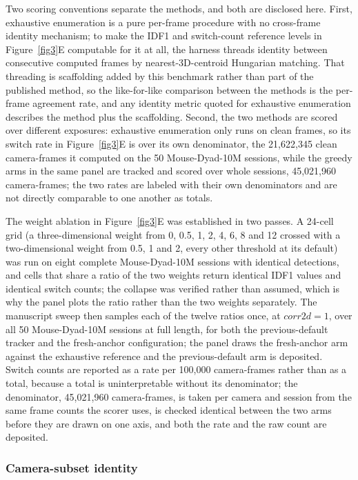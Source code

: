\documentclass[pdflatex, sn-nature]{sn-jnl}
\theoremstyle{thmstyleone}%
\theoremstyle{thmstyletwo}%
\theoremstyle{thmstylethree}%
\begin{document}
Two scoring conventions separate the methods, and both are disclosed here. First, exhaustive enumeration is a pure per-frame procedure with no cross-frame identity mechanism; to make the IDF1 and switch-count reference levels in Figure~\ref{fig3}E computable for it at all, the harness threads identity between consecutive computed frames by nearest-3D-centroid Hungarian matching. That threading is scaffolding added by this benchmark rather than part of the published method, so the like-for-like comparison between the methods is the per-frame agreement rate, and any identity metric quoted for exhaustive enumeration describes the method plus the scaffolding. Second, the two methods are scored over different exposures: exhaustive enumeration only runs on clean frames, so its switch rate in Figure~\ref{fig3}E is over its own denominator, the 21,622,345 clean camera-frames it computed on the 50 Mouse-Dyad-10M sessions, while the greedy arms in the same panel are tracked and scored over whole sessions, 45,021,960 camera-frames; the two rates are labeled with their own denominators and are not directly comparable to one another as totals.

The weight ablation in Figure~\ref{fig3}E was established in two passes. A 24-cell grid (a three-dimensional weight from 0, 0.5, 1, 2, 4, 6, 8 and 12 crossed with a two-dimensional weight from 0.5, 1 and 2, every other threshold at its default) was run on eight complete Mouse-Dyad-10M sessions with identical detections, and cells that share a ratio of the two weights return identical IDF1 values and identical switch counts; the collapse was verified rather than assumed, which is why the panel plots the ratio rather than the two weights separately. The manuscript sweep then samples each of the twelve ratios once, at $corr2d = 1$, over all 50 Mouse-Dyad-10M sessions at full length, for both the previous-default tracker and the fresh-anchor configuration; the panel draws the fresh-anchor arm against the exhaustive reference and the previous-default arm is deposited. Switch counts are reported as a rate per 100,000 camera-frames rather than as a total, because a total is uninterpretable without its denominator; the denominator, 45,021,960 camera-frames, is taken per camera and session from the same frame counts the scorer uses, is checked identical between the two arms before they are drawn on one axis, and both the rate and the raw count are deposited.

\subsubsection{Camera-subset identity}\label{methods-subset}
\end{document}
